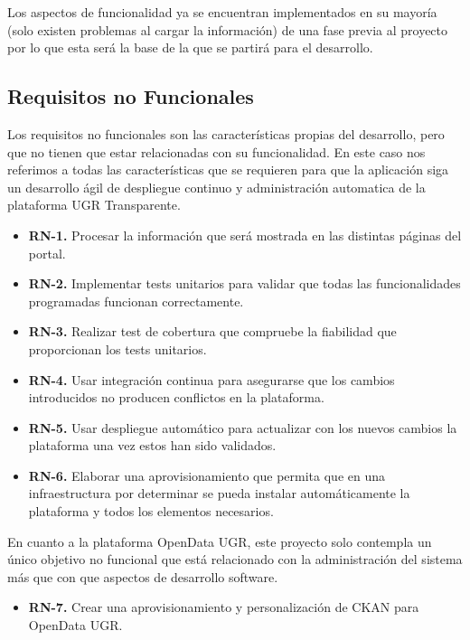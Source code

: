 Los aspectos de funcionalidad ya se encuentran implementados en su mayoría (solo existen problemas al cargar la información) de
una fase previa al proyecto por lo que esta será la base de la que se partirá para el desarrollo.

\subsection{Requisitos no Funcionales}

Los requisitos no funcionales son las características propias del desarrollo, pero que no tienen que estar relacionadas con su 
funcionalidad. En este caso nos referimos a todas las características que se requieren para que la aplicación siga un 
desarrollo ágil de despliegue continuo y administración automatica de la plataforma UGR Transparente.

\begin{itemize}
  \item \textbf{RN-1.} Procesar la información que será mostrada en las distintas páginas del portal.
  \item \textbf{RN-2.} Implementar tests unitarios para validar que todas las funcionalidades programadas funcionan 
  correctamente.
  \item \textbf{RN-3.} Realizar test de cobertura que compruebe la fiabilidad que proporcionan los tests unitarios.
  \item \textbf{RN-4.} Usar integración continua para asegurarse que los cambios introducidos no producen conflictos en la 
  plataforma.
  \item \textbf{RN-5.} Usar despliegue automático para actualizar con los nuevos cambios la plataforma una vez estos han sido 
  validados.
  \item \textbf{RN-6.} Elaborar una aprovisionamiento que permita que en una infraestructura por determinar se pueda instalar 
  automáticamente la plataforma y todos los elementos necesarios.
\end{itemize}

En cuanto a la plataforma OpenData UGR, este proyecto solo contempla un único objetivo no funcional que está relacionado con
la administración del sistema más que con que aspectos de desarrollo software.

\begin{itemize}
  \item \textbf{RN-7.} Crear una aprovisionamiento y personalización de CKAN para OpenData UGR.
\end{itemize}

